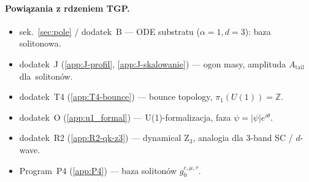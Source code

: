 \paragraph{Powiązania z rdzeniem TGP.}
\begin{itemize}[nosep]
  \item sek.~\ref{sec:pole} / dodatek~B --- ODE substratu ($\alpha{=}1, d{=}3$): baza solitonowa.
  \item dodatek~J (\ref{app:J-profil}, \ref{app:J-skalowanie}) --- ogon masy, amplituda $A_\text{tail}$ dla~soliton\'ow.
  \item dodatek~T4 (\ref{app:T4-bounce}) --- bounce topology, $\pi_1(U(1)) = \mathbb{Z}$.
  \item dodatek~O (\ref{app:u1_formal}) --- U(1)-formalizacja, faza $\psi = |\psi|e^{i\theta}$.
  \item dodatek~R2 (\ref{app:R2-qk-z3}) --- dynamical Z$_3$, analogia dla 3-band SC / $d$-wave.
  \item Program~P4 (\ref{app:P4}) --- baza soliton\'ow $g_0^{e,\mu,\tau}$.
\end{itemize}
